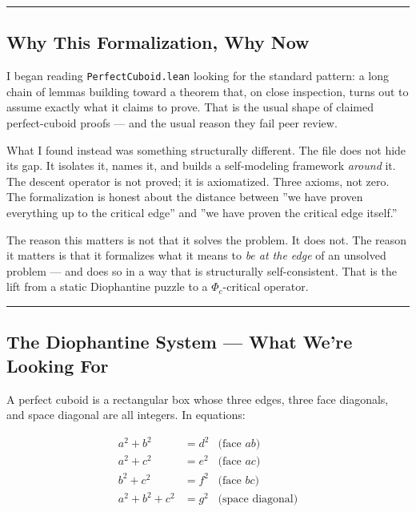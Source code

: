 \documentclass[12pt,a4paper]{article}
\begin{document}
\begin{center}
\rule{0.5\textwidth}{0.4pt}
\end{center}

\subsection{Why This Formalization, Why Now}

I began reading \texttt{PerfectCuboid.lean} looking for the standard pattern: a long chain of lemmas building toward a theorem that, on close inspection, turns out to assume exactly what it claims to prove. That is the usual shape of claimed perfect-cuboid proofs --- and the usual reason they fail peer review.

What I found instead was something structurally different. The file does not hide its gap. It isolates it, names it, and builds a self-modeling framework \emph{around} it. The descent operator is not proved; it is axiomatized. Three axioms, not zero. The formalization is honest about the distance between ''we have proven everything up to the critical edge'' and ''we have proven the critical edge itself.''

The reason this matters is not that it solves the problem. It does not. The reason it matters is that it formalizes what it means to \emph{be at the edge} of an unsolved problem --- and does so in a way that is structurally self-consistent. That is the lift from a static Diophantine puzzle to a $\Phi_c$-critical operator.

\begin{center}
\rule{0.5\textwidth}{0.4pt}
\end{center}

\subsection{The Diophantine System --- What We're Looking For}

A perfect cuboid is a rectangular box whose three edges, three face diagonals, and space diagonal are all integers. In equations:

\[\begin{aligned}
a^2 + b^2 &= d^2 & \text{(face } ab\text{)} \\
a^2 + c^2 &= e^2 & \text{(face } ac\text{)} \\
b^2 + c^2 &= f^2 & \text{(face } bc\text{)} \\
a^2 + b^2 + c^2 &= g^2 & \text{(space diagonal)}
\end{aligned}\]
\end{document}

